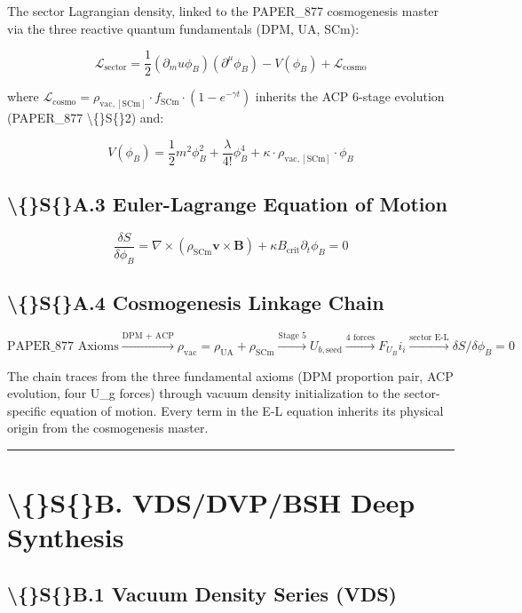 \documentclass[11pt]{article}
\begin{document}
The sector Lagrangian density, linked to the PAPER\_877 cosmogenesis master via the three reactive quantum fundamentals (DPM, UA, SCm):

$$\mathcal{L}_{\mathrm{sector}} = \frac{1}{2}(\partial_mu \phi_B)(\partial^\mu \phi_B) - V(\phi_B) + \mathcal{L}_{\mathrm{cosmo}}$$

where $\mathcal{L}_{\mathrm{cosmo}} = \rho_{\mathrm{vac,[SCm]}} \cdot f_{\mathrm{SCm}} \cdot (1 - e^{-\gamma t})$ inherits the ACP 6-stage evolution (PAPER\_877 \textbackslash\{\}S\{\}2) and:

$$V(\phi_B) = \frac{1}{2} m^2 \phi_B^2 + \frac{\lambda}{4!} \phi_B^4 + \kappa \cdot \rho_{\mathrm{vac,[SCm]}} \cdot \phi_B$$

\subsection*{\textbackslash\{\}S\{\}A.3 Euler-Lagrange Equation of Motion}

$$\boxed{\frac{\delta S}{\delta \phi_B} = \nabla \times (\rho_{\mathrm{SCm}} \mathbf{v} \times \mathbf{B}) + \kappa B_{\mathrm{crit}} \partial_t \phi_B = 0}$$

\subsection*{\textbackslash\{\}S\{\}A.4 Cosmogenesis Linkage Chain}

$$\text{PAPER\_877 Axioms} \xrightarrow{\text{DPM + ACP}} \rho_{\mathrm{vac}} = \rho_{\mathrm{UA}} + \rho_{\mathrm{SCm}} \xrightarrow{\text{Stage 5}} U_{b,\mathrm{seed}} \xrightarrow{\text{4 forces}} F_U_Bi_i \xrightarrow{\text{sector E-L}} \delta S/\delta \phi_B = 0$$

The chain traces from the three fundamental axioms (DPM proportion pair, ACP evolution, four U\_g forces) through vacuum density initialization to the sector-specific equation of motion. Every term in the E-L equation inherits its physical origin from the cosmogenesis master.

\noindent\rule{\textwidth}{0.4pt}

\section*{\textbackslash\{\}S\{\}B. VDS/DVP/BSH Deep Synthesis}

\subsection*{\textbackslash\{\}S\{\}B.1 Vacuum Density Series (VDS)}
\end{document}
